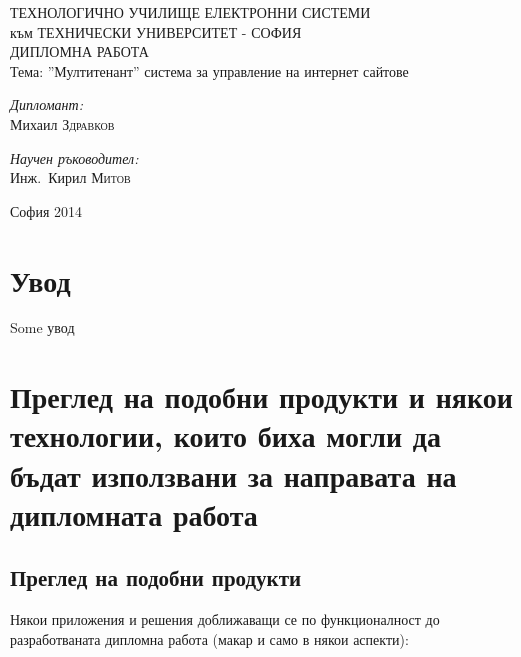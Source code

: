 \documentclass[pdftex,12pt,a4paper]{report}
\begin{document}
\setcounter{secnumdepth}{3}
\setcounter{tocdepth}{3}
\begin{titlepage}
	\begin{center}
		{\Huge ТЕХНОЛОГИЧНО УЧИЛИЩЕ ЕЛЕКТРОННИ СИСТЕМИ\\[0.5cm]} {\Large към ТЕХНИЧЕСКИ УНИВЕРСИТЕТ - СОФИЯ\\[3cm]}
		{\Huge ДИПЛОМНА РАБОТА\\[3cm]}
		Тема: ''Мултитенант'' система за управление на интернет сайтове\\[3cm]
		\begin{minipage}{0.4\textwidth}
			\begin{flushleft} \large
				\emph{Дипломант:}\\
				Михаил \textsc{Здравков}
			\end{flushleft}
		\end{minipage}
		\begin{minipage}{0.4\textwidth}
			\begin{flushright} \large
				\emph{Научен ръководител:} \\
				Инж.~Кирил \textsc{Митов}
			\end{flushright}
		\end{minipage}

		\vfill

		{\large София 2014}

	\end{center}
\end{titlepage}
\tableofcontents
\pagebreak
{}
\chapter*{Увод}
Some увод
\chapter {Преглед на подобни продукти и някои технологии, които биха могли да бъдат използвани за направата на дипломната работа}
\section {Преглед на подобни продукти}
Някои приложения и решения доближаващи се по функционалност до разработваната дипломна работа (макар и само в някои аспекти):
\end{document}
